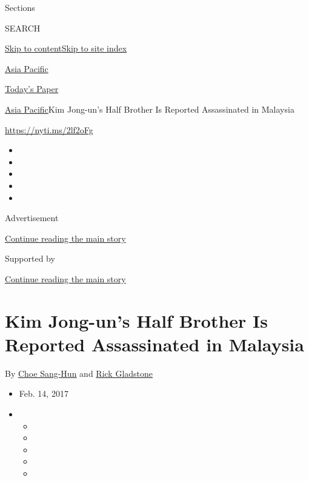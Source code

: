Sections

SEARCH

\protect\hyperlink{site-content}{Skip to
content}\protect\hyperlink{site-index}{Skip to site index}

\href{https://www.nytimes3xbfgragh.onion/section/world/asia}{Asia
Pacific}

\href{https://myaccount.nytimes3xbfgragh.onion/auth/login?response_type=cookie\&client_id=vi}{}

\href{https://www.nytimes3xbfgragh.onion/section/todayspaper}{Today's
Paper}

\href{/section/world/asia}{Asia Pacific}\textbar{}Kim Jong-un's Half
Brother Is Reported Assassinated in Malaysia

\url{https://nyti.ms/2lf2oFg}

\begin{itemize}
\item
\item
\item
\item
\item
\end{itemize}

Advertisement

\protect\hyperlink{after-top}{Continue reading the main story}

Supported by

\protect\hyperlink{after-sponsor}{Continue reading the main story}

\hypertarget{kim-jong-uns-half-brother-is-reported-assassinated-in-malaysia}{%
\section{Kim Jong-un's Half Brother Is Reported Assassinated in
Malaysia}\label{kim-jong-uns-half-brother-is-reported-assassinated-in-malaysia}}

By \href{http://www.nytimes3xbfgragh.onion/by/choe-sang-hun}{Choe
Sang-Hun} and
\href{https://www.nytimes3xbfgragh.onion/by/rick-gladstone}{Rick
Gladstone}

\begin{itemize}
\item
  Feb. 14, 2017
\item
  \begin{itemize}
  \item
  \item
  \item
  \item
  \item
  \end{itemize}
\end{itemize}

